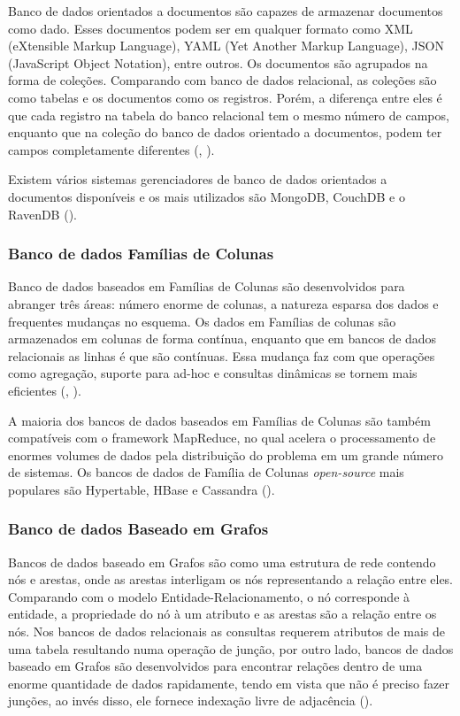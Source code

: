 Banco de dados orientados a documentos são capazes de armazenar documentos como dado. Esses documentos podem ser em qualquer formato como XML (eXtensible Markup Language), YAML (Yet Another Markup Language), JSON (JavaScript Object Notation), entre outros. Os documentos são agrupados na forma de coleções. Comparando com banco de dados relacional, as coleções são como tabelas e os documentos como os registros. Porém, a diferença entre eles é que cada registro na tabela do banco relacional tem o mesmo número de campos, enquanto que na coleção do banco de dados orientado a documentos, podem ter campos completamente diferentes (\cite{kaur:2013}, \cite{fowler:2013}).

Existem vários sistemas gerenciadores de banco de dados orientados a documentos disponíveis e os mais utilizados são MongoDB, CouchDB e o RavenDB (\cite{kaur:2013}).

\subsubsection{Banco de dados Famílias de Colunas}

Banco de dados baseados em Famílias de Colunas são desenvolvidos para abranger três áreas: número enorme de colunas, a natureza esparsa dos dados e frequentes mudanças no esquema. Os dados em Famílias de colunas são armazenados em colunas de forma contínua, enquanto que em bancos de dados relacionais as linhas é que são contínuas. Essa mudança faz com que operações como agregação, suporte para ad-hoc e consultas dinâmicas se tornem mais eficientes (\cite{kaur:2013}, \cite{fowler:2013}).

A maioria dos bancos de dados baseados em Famílias de Colunas são também compatíveis com o framework MapReduce, no qual acelera o processamento de enormes volumes de dados pela distribuição do problema em um grande número de sistemas. Os bancos de dados  de Família de Colunas \textit{open-source} mais populares são Hypertable, HBase e Cassandra (\cite{kaur:2013}).

\subsubsection{Banco de dados Baseado em Grafos}

Bancos de dados baseado em Grafos são como uma estrutura de rede contendo nós e arestas, onde as arestas interligam os nós representando a relação entre eles. Comparando com o modelo Entidade-Relacionamento, o nó corresponde à entidade, a propriedade do nó à um atributo e as arestas são a relação entre os nós. Nos bancos de dados relacionais as consultas requerem atributos de mais de uma tabela resultando numa operação de junção, por outro lado, bancos de dados baseado em Grafos são desenvolvidos para encontrar relações dentro de uma enorme quantidade de dados rapidamente, tendo em vista que não é preciso fazer junções, ao invés disso, ele fornece indexação livre de adjacência (\cite{kaur:2013}).

